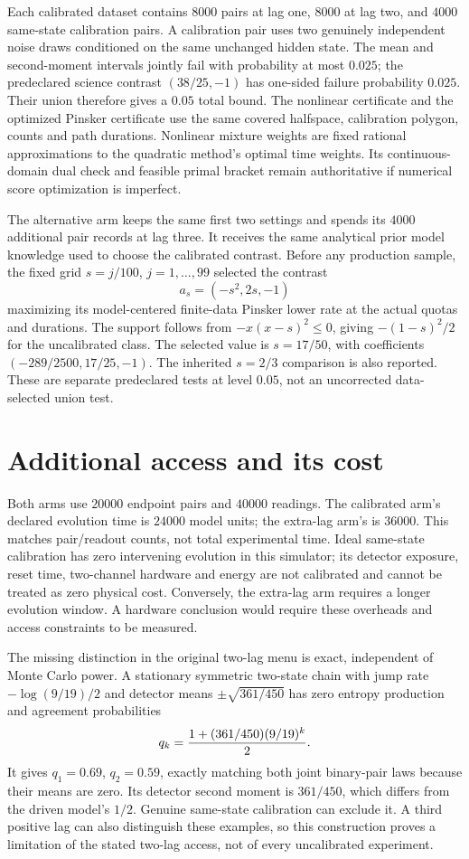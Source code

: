 Each calibrated dataset contains $8000$ pairs at lag one, $8000$ at lag two,
and $4000$ same-state calibration pairs. A calibration pair uses two genuinely
independent noise draws conditioned on the same unchanged hidden state.
The mean and second-moment intervals jointly fail with probability at most
$0.025$; the predeclared science contrast $(38/25,-1)$ has one-sided failure
probability $0.025$. Their union therefore gives a $0.05$ total bound.
The nonlinear certificate and the optimized Pinsker certificate use the same
covered halfspace, calibration polygon, counts and path durations. Nonlinear
mixture weights are fixed rational approximations to the quadratic method's
optimal time weights. Its continuous-domain dual check and feasible primal
bracket remain authoritative if numerical score optimization is imperfect.

The alternative arm keeps the same first two settings and spends its $4000$
additional pair records at lag three. It receives the same analytical prior
model knowledge used to choose the calibrated contrast. Before any production
sample, the fixed grid $s=j/100$, $j=1,\ldots,99$ selected the contrast
\[
 a_s=(-s^2,2s,-1)
\]
maximizing its model-centered finite-data Pinsker lower rate at the actual
quotas and durations. The support follows from
$-x(x-s)^2\le0$, giving $-(1-s)^2/2$ for the uncalibrated class.
The selected value is $s=17/50$, with coefficients
$(-289/2500,17/25,-1)$. The inherited $s=2/3$ comparison is also reported.
These are separate predeclared tests at level $0.05$, not an uncorrected
data-selected union test.

\section{Additional access and its cost}
Both arms use $20000$ endpoint pairs and $40000$ readings. The calibrated
arm's declared evolution time is $24000$ model units; the extra-lag arm's is
$36000$. This matches pair/readout counts, not total experimental time.
Ideal same-state calibration has zero intervening evolution in this simulator;
its detector exposure, reset time, two-channel hardware and energy are not
calibrated and cannot be treated as zero physical cost. Conversely, the
extra-lag arm requires a longer evolution window. A hardware conclusion would
require these overheads and access constraints to be measured.

The missing distinction in the original two-lag menu is exact, independent of
Monte Carlo power. A stationary symmetric two-state chain with jump rate
$-\log(9/19)/2$ and detector means $\pm\sqrt{361/450}$ has zero entropy
production and agreement probabilities
\[
 q_k={1+(361/450)(9/19)^k\over2}.
\]
It gives $q_1=0.69$, $q_2=0.59$, exactly matching both joint binary-pair laws
because their means are zero. Its detector second moment is $361/450$, which
differs from the driven model's $1/2$. Genuine same-state calibration can
exclude it. A third positive lag can also distinguish these examples, so this
construction proves a limitation of the stated two-lag access, not of every
uncalibrated experiment.

